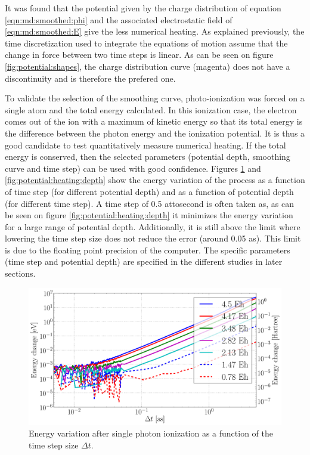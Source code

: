 It was found that the potential given by the charge distribution of equation
\eqref{eqn:md:smoothed:phi} and the associated electrostatic field of
\eqref{eqn:md:smoothed:E} give the less numerical heating. As explained
previously, the time discretization used to integrate the equations of motion
assume that the change in force between two time steps is linear. As can be
seen on figure \ref{fig:potential:shapes}, the charge distribution curve
(magenta) does not have a discontinuity and is therefore the prefered one.

To validate the selection of the smoothing curve, photo-ionization was forced
on a single atom and the total energy calculated. In this ionization case, the
electron comes out of the ion with a maximum of kinetic energy so that
its total energy is the difference between the photon energy and the ionization
potential. It is thus a
good candidate to test quantitatively measure numerical heating. If the total
energy is conserved, then the selected parameters (potential depth, smoothing
curve and time step) can be used with good confidence. Figures
\ref{fig:potential:heating:dt} and \ref{fig:potential:heating:depth} show the
energy variation of the process as a function of time step (for different
potential depth) and as a function of potential depth (for different time step).
A time step of 0.5 attosecond is often taken as, as can be seen on figure
\ref{fig:potential:heating:depth} it minimizes the energy variation for a large
range of potential depth. Additionally, it is still above the limit where
lowering the time step size does not reduce the error (around 0.05 as). This
limit is due to the floating point precision of the computer. The specific
parameters (time step and potential depth) are specified in the different
studies in later sections.


\begin{figure}
 \centering
 \includegraphics[width=\figurewidth]{figures/numerical_heating_dt}
 \caption{\label{fig:potential:heating:dt}Energy variation after single photon
          ionization as a function of the time step size $\Delta t$.}
\end{figure}

